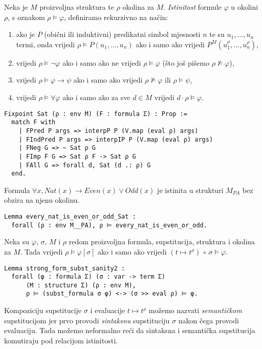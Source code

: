 \begin{definition}
  Neka je \(M\) proizvoljna struktura te \(\rho\) okolina za \(M\).
  \textit{Istinitost} formule \(\varphi\) u okolini \(\rho\), s oznakom \(\rho \vDash \varphi\),
  definiramo rekurzivno na način:
  \begin{enumerate}
  \item ako je \(P\) (obični ili induktivni) predikatni simbol mjesnosti \(n\)
    te su \(u_{1}, \ldots, u_{n}\) termi,
    onda vrijedi \(\rho \vDash P(u_{1}, \ldots, u_{n})\) ako i samo ako vrijedi \(P^{M}(u_{1}^{\rho}, \ldots, u_{n}^{\rho})\),
  \item vrijedi \(\rho \vDash \neg \varphi \) ako i samo ako ne vrijedi \(\rho \vDash \varphi\) (što još pišemo \(\rho \not \vDash \varphi\)),
  \item vrijedi \(\rho \vDash \varphi \rightarrow \psi \) ako i samo ako vrijedi \(\rho \not \vDash \varphi\) ili \(\rho \vDash \psi\),
  \item vrijedi \(\rho \vDash \forall \varphi\) ako i samo ako za sve \(d \in M\) vrijedi \(d \cdot \rho \vDash \varphi\).
  \end{enumerate}
\begin{verbatim}
Fixpoint Sat (ρ : env M) (F : formula Σ) : Prop :=
  match F with
    | FPred P args => interpP P (V.map (eval ρ) args)
    | FIndPred P args => interpIP P (V.map (eval ρ) args)
    | FNeg G => ~ Sat ρ G
    | FImp F G => Sat ρ F -> Sat ρ G
    | FAll G => forall d, Sat (d .: ρ) G
  end.
\end{verbatim}
\end{definition}

\begin{example}
  Formula \(\forall x, \mathit{Nat}(x) \rightarrow \mathit{Even}(x) \lor \mathit{Odd}(x)\) je istinita u strukturi \(M_{\mathit{PA}}\)
  bez obzira na njenu okolinu.
\begin{verbatim}
Lemma every_nat_is_even_or_odd_Sat :
  forall (ρ : env M__PA), ρ ⊨ every_nat_is_even_or_odd.
\end{verbatim}
\end{example}

\begin{lemma}
  Neka su \(\varphi\), \(\sigma\), \(M\) i \(\rho\) redom
  proizvoljna formula, supstitucija, struktura i okolina za \(M\).
  Tada vrijedi \(\rho \vDash \varphi[\sigma]\) ako i samo ako vrijedi \( (t \mapsto t^{\rho}) \, \circ \, \sigma \vDash \varphi\).
\begin{verbatim}
Lemma strong_form_subst_sanity2 :
  forall (φ : formula Σ) (σ : var -> term Σ)
      (M : structure Σ) (ρ : env M),
      ρ ⊨ (subst_formula σ φ) <-> (σ >> eval ρ) ⊨ φ.
\end{verbatim}
  \noindent Kompoziciju supstitucije \(\sigma\) i evaluacije \(t \mapsto t^{\rho}\)
  možemo nazvati \textit{semantičkom} supstitucijom
  jer prvo provodi \textit{sintaksnu} supstituciju \(\sigma\) nakon čega provodi evaluaciju.
  Tada možemo neformalno reći da sintaksna i semantička supstitucija
  komutiraju pod relacijom istinitosti.
\end{lemma}

